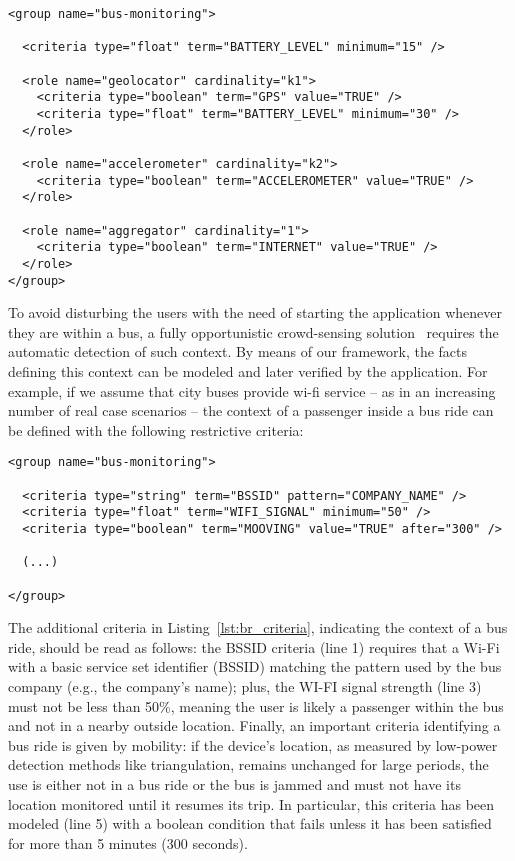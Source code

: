 \begin{lstlisting}[caption=Specification of a bus monitoring group, label=lst:bm_criteria, captionpos=t]
<group name="bus-monitoring">
  
  <criteria type="float" term="BATTERY_LEVEL" minimum="15" />
  
  <role name="geolocator" cardinality="k1">
    <criteria type="boolean" term="GPS" value="TRUE" />
    <criteria type="float" term="BATTERY_LEVEL" minimum="30" />
  </role>
  
  <role name="accelerometer" cardinality="k2">
    <criteria type="boolean" term="ACCELEROMETER" value="TRUE" />
  </role>
  
  <role name="aggregator" cardinality="1">
    <criteria type="boolean" term="INTERNET" value="TRUE" />
  </role>
</group>
\end{lstlisting}

To avoid disturbing the users with the need of starting the application whenever they are within a bus, a fully opportunistic crowd-sensing solution~\cite{Guo:2015} requires the automatic detection of such context. By means of our framework, the facts defining this context can be modeled and later verified by the application. For example, if we assume that city buses provide wi-fi service -- as in an increasing number of real case scenarios -- the context of a passenger inside a bus ride can be defined with the following restrictive criteria: 

\begin{lstlisting}[caption=Additional criteria to specify a bus ride context, label=lst:br_criteria, captionpos=t]
<group name="bus-monitoring">

  <criteria type="string" term="BSSID" pattern="COMPANY_NAME" />
  <criteria type="float" term="WIFI_SIGNAL" minimum="50" />
  <criteria type="boolean" term="MOOVING" value="TRUE" after="300" />
  
  (...)

</group>
\end{lstlisting}

The additional criteria in Listing~\ref{lst:br_criteria}, indicating the context of a bus ride, should be read as follows: the BSSID criteria (line 1) requires that a Wi-Fi with a basic service set identifier (BSSID) matching the pattern used by the bus company (e.g., the company's name); plus, the WI-FI signal strength (line 3) must not be less than 50\%, meaning the user is likely a passenger within the bus and not in a nearby outside location. Finally, an important criteria identifying a bus ride is given by mobility: if the device's location, as measured by low-power detection methods like triangulation, remains unchanged for large periods, the use is either not in a bus ride or the bus is jammed and must not have its location monitored until it resumes its trip. In particular, this criteria has been modeled (line 5) with a boolean condition that fails unless it has been satisfied for more than 5 minutes (300 seconds).



